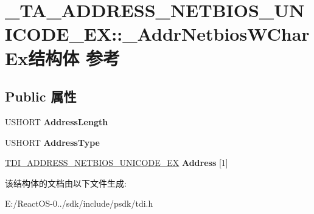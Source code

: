 \hypertarget{struct___t_a___a_d_d_r_e_s_s___n_e_t_b_i_o_s___u_n_i_c_o_d_e___e_x_1_1___addr_netbios_w_char_ex}{}\section{\+\_\+\+T\+A\+\_\+\+A\+D\+D\+R\+E\+S\+S\+\_\+\+N\+E\+T\+B\+I\+O\+S\+\_\+\+U\+N\+I\+C\+O\+D\+E\+\_\+\+EX\+:\+:\+\_\+\+Addr\+Netbios\+W\+Char\+Ex结构体 参考}
\label{struct___t_a___a_d_d_r_e_s_s___n_e_t_b_i_o_s___u_n_i_c_o_d_e___e_x_1_1___addr_netbios_w_char_ex}
\subsection*{Public 属性}
\begin{DoxyCompactItemize}
\item 
\mbox{\label{struct___t_a___a_d_d_r_e_s_s___n_e_t_b_i_o_s___u_n_i_c_o_d_e___e_x_1_1___addr_netbios_w_char_ex_a10dc8d99a1f5e1e27dbc5d5ad4cdeef6}} 
U\+S\+H\+O\+RT {\bfseries Address\+Length}
\item 
\mbox{\label{struct___t_a___a_d_d_r_e_s_s___n_e_t_b_i_o_s___u_n_i_c_o_d_e___e_x_1_1___addr_netbios_w_char_ex_aae32045eb0e64986f82f8a89b28769d4}} 
U\+S\+H\+O\+RT {\bfseries Address\+Type}
\item 
\mbox{\label{struct___t_a___a_d_d_r_e_s_s___n_e_t_b_i_o_s___u_n_i_c_o_d_e___e_x_1_1___addr_netbios_w_char_ex_a1805e5c81649874e75ff15a9c04889a8}} 
\hyperlink{struct___t_d_i___a_d_d_r_e_s_s___n_e_t_b_i_o_s___u_n_i_c_o_d_e___e_x}{T\+D\+I\+\_\+\+A\+D\+D\+R\+E\+S\+S\+\_\+\+N\+E\+T\+B\+I\+O\+S\+\_\+\+U\+N\+I\+C\+O\+D\+E\+\_\+\+EX} {\bfseries Address} \mbox{[}1\mbox{]}
\end{DoxyCompactItemize}


该结构体的文档由以下文件生成\+:\begin{DoxyCompactItemize}
\item 
E\+:/\+React\+O\+S-\/0../sdk/include/psdk/tdi.\+h\end{DoxyCompactItemize}
